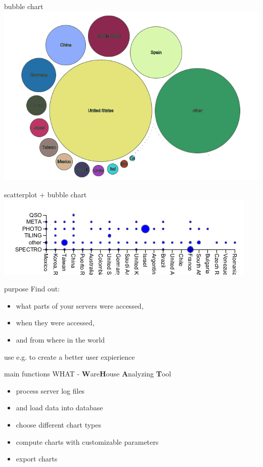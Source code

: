 \documentclass[xcolor=dvipsnames]{beamer}
\begin{document}
\begin{frame}{bubble chart}
	\includegraphics[width=1\linewidth]{Pictures/bubblechart.png}
\end{frame}

\begin{frame}{scatterplot + bubble chart}
	\includegraphics[width=1\linewidth]{Pictures/bubblescatter.png}
\end{frame}

\begin{frame}{purpose}
	Find out:
	\begin{itemize}
		\item<1-> what parts of your servers were accessed,
		\item<2-> when they were accessed,
		\item<3-> and from where in the world
	\end{itemize}
	 {use e.g. to create a better user expierience}
\end{frame}

\begin{frame}{main functions}
 WHAT - \textbf{W}are\textbf{H}ouse \textbf{A}nalyzing \textbf{T}ool
	\begin{itemize}
	  \item<2-> process server log files
	  \item<2-> and load data into database
	  \item<3-> choose different chart types
	  \item<4-> compute charts with customizable parameters
	  \item<5-> export charts
	\end{itemize}
\end{frame}
\end{document}
